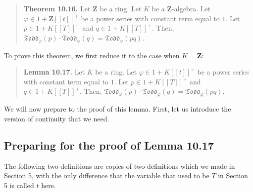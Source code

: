 \documentclass[numbers=enddot,12pt,final,onecolumn,notitlepage]{scrartcl}%
\begin{document}
\begin{quote}
\textbf{Theorem 10.16.} Let $\mathbf{Z}$ be a ring. Let $K$ be a $\mathbf{Z}%
$-algebra. Let $\varphi\in1+\mathbf{Z}\left[  \left[  t\right]  \right]  ^{+}$
be a power series with constant term equal to $1$. Let $p\in1+K\left[  \left[
T\right]  \right]  ^{+}$ and $q\in1+K\left[  \left[  T\right]  \right]  ^{+}$.
Then, $\mathfrak{Todd}_{\varphi}\left(  p\right)  \cdot\mathfrak{Todd}%
_{\varphi}\left(  q\right)  =\mathfrak{Todd}_{\varphi}\left(  pq\right)  $.
\end{quote}

To prove this theorem, we first reduce it to the case when $K=\mathbf{Z}$:

\begin{quote}
\textbf{Lemma 10.17.} Let $K$ be a ring. Let $\varphi\in1+K\left[  \left[
t\right]  \right]  ^{+}$ be a power series with constant term equal to $1$.
Let $p\in1+K\left[  \left[  T\right]  \right]  ^{+}$ and $q\in1+K\left[
\left[  T\right]  \right]  ^{+}$. Then, $\mathfrak{Todd}_{\varphi}\left(
p\right)  \cdot\mathfrak{Todd}_{\varphi}\left(  q\right)  =\mathfrak{Todd}%
_{\varphi}\left(  pq\right)  $.
\end{quote}

We will now prepare to the proof of this lemma. First, let us introduce the
version of continuity that we need.

\subsection{Preparing for the proof of Lemma 10.17}

The following two definitions are copies of two definitions which we made in
Section 5, with the only difference that the variable that used to be $T$ in
Section 5 is called $t$ here.
\end{document}
